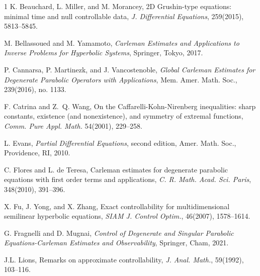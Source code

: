 \documentclass[11pt]{article}
\numberwithin{equation}{section}
\begin{document}
\begin{thebibliography}{1}
			 K. Beauchard, L. Miller, and M. Morancey,  2D Grushin-type equations: minimal time and null controllable data,
			{\it J. Differential Equations},  259(2015), 5813--5845.
			
			
			
			 M. Bellassoued and M. Yamamoto, {\it Carleman Estimates and Applications to Inverse Problems for Hyperbolic Systems},
			Springer, Tokyo, 2017.
			
			
			
			
			 P. Cannarsa, P. Martinezk,   and J. Vancostenoble,
			{\it Global Carleman Estimates for Degenerate Parabolic Operators with Applications},
			Mem. Amer. Math. Soc.,  239(2016), no. 1133.
			
			
			 F. Catrina and Z.~Q. Wang, On the Caffarelli-Kohn-Nirenberg inequalities: sharp constants, existence (and nonexistence), and symmetry of extremal functions, {\it Comm. Pure Appl. Math.} 54(2001), 229--258.
			
			 L. Evans, {\it Partial Differential Equations}, second edition,
			Amer. Math. Soc., Providence, RI, 2010.
			
			  C. Flores and L. de Teresa, Carleman estimates for degenerate parabolic equations with first order terms and applications,
			{\it C. R. Math. Acad. Sci. Paris},  348(2010),  391--396.		
			
			
			 X. Fu, J. Yong, and X. Zhang, Exact controllability for multidimensional semilinear hyperbolic equations,
 {\it SIAM J. Control Optim.},  46(2007), 1578--1614.
			
			 G. Fragnelli and D. Mugnai, {\it Control of Degenerate and Singular Parabolic Equations-Carleman
 Estimates and Observability}, Springer,  Cham, 2021.
			
			 J.L. Lions,  Remarks on approximate controllability, {\it J. Anal. Math.}, 59(1992), 103--116.
			

\end{thebibliography}
\end{document}
